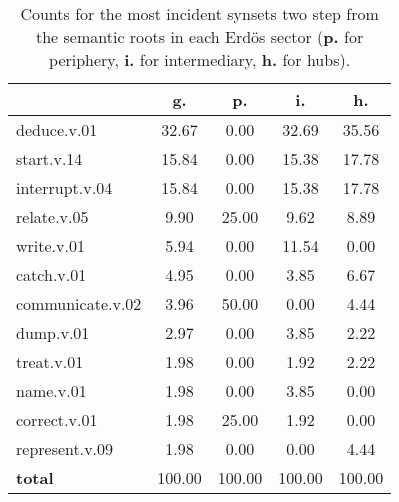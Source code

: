 \begin{table}[h!]
\begin{center}
\begin{tabular}{| l || c | c | c | c |}\hline
 & {\bf g.} & {\bf p.} & {\bf i.} & {\bf h.} \\\hline\hline
deduce.v.01 & 32.67  & 0.00  & 32.69  & 35.56 \\\hline
start.v.14 & 15.84  & 0.00  & 15.38  & 17.78 \\\hline
interrupt.v.04 & 15.84  & 0.00  & 15.38  & 17.78 \\\hline
relate.v.05 & 9.90  & 25.00  & 9.62  & 8.89 \\\hline
write.v.01 & 5.94  & 0.00  & 11.54  & 0.00 \\\hline
catch.v.01 & 4.95  & 0.00  & 3.85  & 6.67 \\\hline
communicate.v.02 & 3.96  & 50.00  & 0.00  & 4.44 \\\hline
dump.v.01 & 2.97  & 0.00  & 3.85  & 2.22 \\\hline
treat.v.01 & 1.98  & 0.00  & 1.92  & 2.22 \\\hline
name.v.01 & 1.98  & 0.00  & 3.85  & 0.00 \\\hline
correct.v.01 & 1.98  & 25.00  & 1.92  & 0.00 \\\hline
represent.v.09 & 1.98  & 0.00  & 0.00  & 4.44 \\\hline\hline
{{\bf total}} & 100.00  & 100.00  & 100.00  & 100.00 \\\hline
\end{tabular}
\caption{Counts for the most incident synsets two step from the semantic roots in each Erd\"os sector ({\bf p.} for periphery, {\bf i.} for intermediary, {\bf h.} for hubs).}
\end{center}
\end{table}
